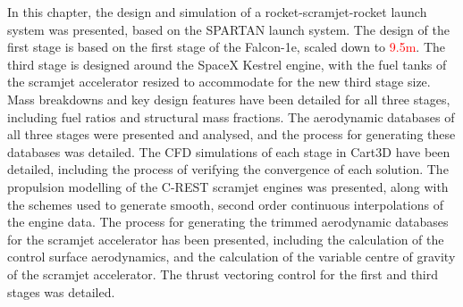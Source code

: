 	
	
	
	
	
	
	In this chapter, the design and simulation of a rocket-scramjet-rocket launch system was presented, based on the SPARTAN launch system. 
	The design of the first stage is based on the first stage of the Falcon-1e, scaled down to \textcolor{red}{9.5m}. The third stage is designed around the SpaceX Kestrel engine, with the fuel tanks of the scramjet accelerator resized to accommodate for the new third stage size. 
	 Mass breakdowns and key design features have been detailed for all three stages, including fuel ratios and structural mass fractions.
	 The aerodynamic databases of all three stages were presented and analysed, and the process for generating these databases was detailed. 
	 The CFD simulations of each stage in Cart3D have been detailed, including the process of verifying the convergence of each solution. 
	 The propulsion modelling of the C-REST scramjet engines was presented, along with the schemes used to generate smooth, second order continuous interpolations of the engine data. 
	The process for generating the trimmed aerodynamic databases for the scramjet accelerator has been presented, including the calculation of the control surface aerodynamics, and the calculation of the variable centre of gravity of the scramjet accelerator. The thrust vectoring control for the first and third stages was detailed.
	
	